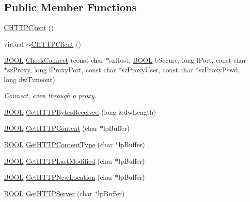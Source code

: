 \subsection*{\-Public \-Member \-Functions}
\begin{DoxyCompactItemize}
\item 
\hyperlink{class_c_h_t_t_p_client_a57b036ec3060bc82ae39b6be5322c532}{\-C\-H\-T\-T\-P\-Client} ()
\item 
virtual \hyperlink{class_c_h_t_t_p_client_a3bdb68b5ce1e9c532b2acba2b096eae8}{$\sim$\-C\-H\-T\-T\-P\-Client} ()
\item 
\hyperlink{_cpclient_8h_a3be13892ae7076009afcf121347dd319}{\-B\-O\-O\-L} \hyperlink{class_c_h_t_t_p_client_a3a63aeec6ef9c56a2d8c60641d1cfe7b}{\-Check\-Connect} (const char $\ast$sz\-Host, \hyperlink{_cpclient_8h_a3be13892ae7076009afcf121347dd319}{\-B\-O\-O\-L} b\-Secure, long l\-Port, const char $\ast$sz\-Proxy, long l\-Proxy\-Port, const char $\ast$sz\-Proxy\-User, const char $\ast$sz\-Proxy\-Pswd, long dw\-Timeout)
\begin{DoxyCompactList}\small\item\em \-Connect, even through a proxy. \end{DoxyCompactList}\item 
\hyperlink{_cpclient_8h_a3be13892ae7076009afcf121347dd319}{\-B\-O\-O\-L} \hyperlink{class_c_h_t_t_p_client_a30c615b243b825ada901e671aa1ac420}{\-Get\-H\-T\-T\-P\-Bytes\-Received} (long \&dw\-Length)
\item 
\hyperlink{_cpclient_8h_a3be13892ae7076009afcf121347dd319}{\-B\-O\-O\-L} \hyperlink{class_c_h_t_t_p_client_a088f8e9749c7f4912c2e3de05573069b}{\-Get\-H\-T\-T\-P\-Content} (char $\ast$lp\-Buffer)
\item 
\hyperlink{_cpclient_8h_a3be13892ae7076009afcf121347dd319}{\-B\-O\-O\-L} \hyperlink{class_c_h_t_t_p_client_a831e33c4c95d4e2b02acb299e4c9933f}{\-Get\-H\-T\-T\-P\-Content\-Type} (char $\ast$lp\-Buffer)
\item 
\hyperlink{_cpclient_8h_a3be13892ae7076009afcf121347dd319}{\-B\-O\-O\-L} \hyperlink{class_c_h_t_t_p_client_ab4b0c28fe04c67c29ee3facbad06c764}{\-Get\-H\-T\-T\-P\-Last\-Modified} (char $\ast$lp\-Buffer)
\item 
\hyperlink{_cpclient_8h_a3be13892ae7076009afcf121347dd319}{\-B\-O\-O\-L} \hyperlink{class_c_h_t_t_p_client_ad832d1fd8d84430248279deb2bff4659}{\-Get\-H\-T\-T\-P\-New\-Location} (char $\ast$lp\-Buffer)
\item 
\hyperlink{_cpclient_8h_a3be13892ae7076009afcf121347dd319}{\-B\-O\-O\-L} \hyperlink{class_c_h_t_t_p_client_a3af2141e7152ee9db4a8833b96676af4}{\-Get\-H\-T\-T\-P\-Server} (char $\ast$lp\-Buffer)

\end{DoxyCompactItemize}
